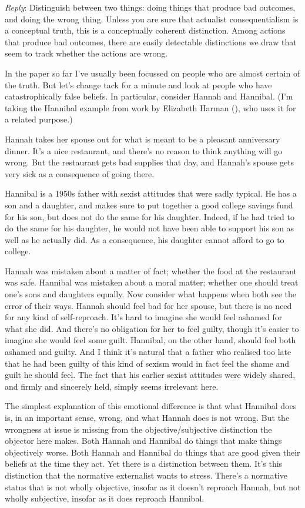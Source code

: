 \documentclass[
  11pt,
  letterpaper,
  DIV=11,
  numbers=noendperiod,
  twoside]{scrartcl}
\begin{document}
\emph{Reply}: Distinguish between two things: doing things that produce
bad outcomes, and doing the wrong thing. Unless you are sure that
actualist consequentialism is a conceptual truth, this is a conceptually
coherent distinction. Among actions that produce bad outcomes, there are
easily detectable distinctions we draw that seem to track whether the
actions are wrong.

In the paper so far I've usually been focussed on people who are almost
certain of the truth. But let's change tack for a minute and look at
people who have catastrophically false beliefs. In particular, consider
Hannah and Hannibal. (I'm taking the Hannibal example from work by
Elizabeth Harman (), who uses it for a
related purpose.)

Hannah takes her spouse out for what is meant to be a pleasant
anniversary dinner. It's a nice restaurant, and there's no reason to
think anything will go wrong. But the restaurant gets bad supplies that
day, and Hannah's spouse gets very sick as a consequence of going there.

Hannibal is a 1950s father with sexist attitudes that were sadly
typical. He has a son and a daughter, and makes sure to put together a
good college savings fund for his son, but does not do the same for his
daughter. Indeed, if he had tried to do the same for his daughter, he
would not have been able to support his son as well as he actually did.
As a consequence, his daughter cannot afford to go to college.

Hannah was mistaken about a matter of fact; whether the food at the
restaurant was safe. Hannibal was mistaken about a moral matter; whether
one should treat one's sons and daughters equally. Now consider what
happens when both see the error of their ways. Hannah should feel bad
for her spouse, but there is no need for any kind of self-reproach. It's
hard to imagine she would feel ashamed for what she did. And there's no
obligation for her to feel guilty, though it's easier to imagine she
would feel some guilt. Hannibal, on the other hand, should feel both
ashamed and guilty. And I think it's natural that a father who realised
too late that he had been guilty of this kind of sexism would in fact
feel the shame and guilt he should feel. The fact that his earlier
sexist attitudes were widely shared, and firmly and sincerely held,
simply seems irrelevant here.

The simplest explanation of this emotional difference is that what
Hannibal does is, in an important sense, wrong, and what Hannah does is
not wrong. But the wrongness at issue is missing from the
objective/subjective distinction the objector here makes. Both Hannah
and Hannibal do things that make things objectively worse. Both Hannah
and Hannibal do things that are good given their beliefs at the time
they act. Yet there is a distinction between them. It's this distinction
that the normative externalist wants to stress. There's a normative
status that is not wholly objective, insofar as it doesn't reproach
Hannah, but not wholly subjective, insofar as it does reproach Hannibal.
\end{document}
